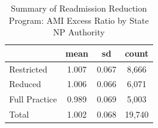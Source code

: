 \begin{table}[htbp]\centering
\def\sym#1{\ifmmode^{#1}\else\(^{#1}\)\fi}
\caption{Summary of Readmission Reduction Program: AMI Excess Ratio by State NP Authority}
\begin{tabular}{l*{1}{ccc}}
\toprule
                    &        mean&          sd&       count\\
\midrule
Restricted          &       1.007&       0.067&       8,666\\
Reduced             &       1.006&       0.066&       6,071\\
Full Practice       &       0.989&       0.069&       5,003\\
Total               &       1.002&       0.068&      19,740\\
\bottomrule
\end{tabular}
\end{table}
